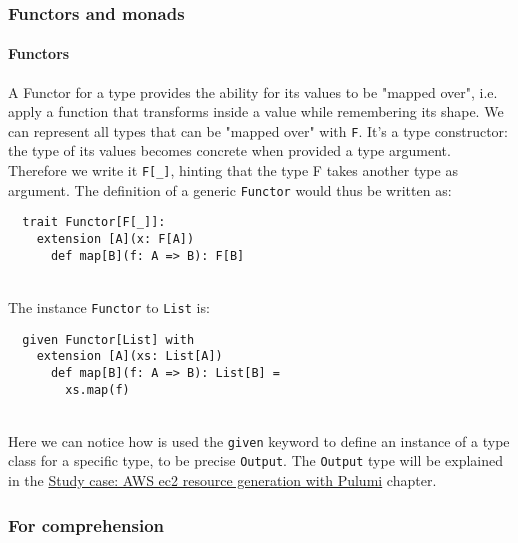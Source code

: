 \subsubsection{Functors and monads}
\paragraph{Functors}
A Functor for a type provides the ability for its values to be "mapped over", i.e. apply a function that transforms inside a value while remembering its shape.
We can represent all types that can be "mapped over" with \texttt{F}.
It's a type constructor: the type of its values becomes concrete when provided a type argument.
Therefore we write it \texttt{F[\_]}, hinting that the type F takes another type as argument.
The definition of a generic \texttt{Functor} would thus be written as:
\begin{verbatim}
  trait Functor[F[_]]:
    extension [A](x: F[A])
      def map[B](f: A => B): F[B]
\end{verbatim}\mbox{}\\
The instance \texttt{Functor} to \texttt{List} is:
\begin{verbatim}
  given Functor[List] with
    extension [A](xs: List[A])
      def map[B](f: A => B): List[B] =
        xs.map(f)
\end{verbatim}\mbox{}\\
Here we can notice how is used the \texttt{given} keyword to define an instance of a type class for a specific type, to be precise \texttt{Output}.
The \texttt{Output} type will be explained in the \hyperref[cap:study-case]{Study case: AWS ec2 resource generation with Pulumi} chapter.

      

\subsubsection{For comprehension}



